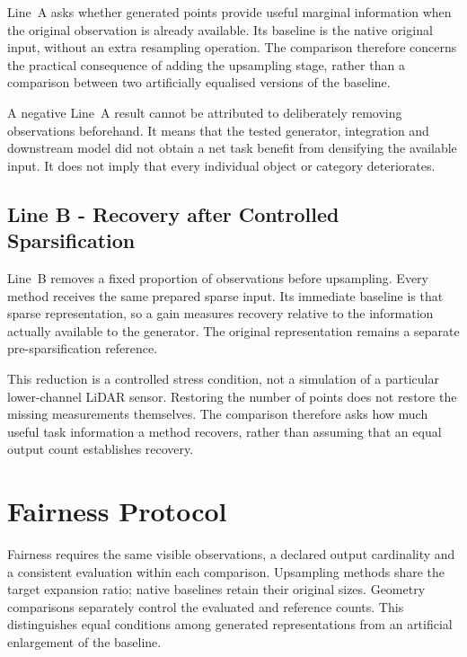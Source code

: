 Line~A asks whether generated points provide useful marginal information
when the original observation is already available. Its baseline is the
native original input, without an extra resampling operation. The
comparison therefore concerns the practical consequence of adding the
upsampling stage, rather than a comparison between two artificially
equalised versions of the baseline.

A negative Line~A result cannot be attributed to deliberately removing
observations beforehand. It means that the tested generator, integration
and downstream model did not obtain a net task benefit from densifying
the available input. It does not imply that every individual object or
category deteriorates.

\subsection{Line B - Recovery after Controlled Sparsification}
\label{sec:fc-3-3-2}

Line~B removes a fixed proportion of observations before upsampling.
Every method receives the same prepared sparse input. Its immediate
baseline is that sparse representation, so a gain measures recovery
relative to the information actually available to the generator. The
original representation remains a separate pre-sparsification reference.

This reduction is a controlled stress condition, not a simulation of
a particular lower-channel LiDAR sensor. Restoring the number of points
does not restore the missing measurements themselves. The comparison
therefore asks how much useful task information a method recovers,
rather than assuming that an equal output count establishes recovery.

\section{Fairness Protocol}
\label{sec:fc-3-4}
\label{sec:fc-3-4-1}
\label{sec:fc-3-4-2}
\label{sec:fc-3-4-3}
\label{sec:upsampling-inference-fairness}
\label{sec:fc-3-4-4}
\label{sec:fc-3-6}

Fairness requires the same visible observations, a declared output
cardinality and a consistent evaluation within each comparison.
Upsampling methods share the target expansion ratio; native baselines
retain their original sizes. Geometry comparisons separately control
the evaluated and reference counts. This distinguishes equal conditions
among generated representations from an artificial enlargement of the
baseline.

